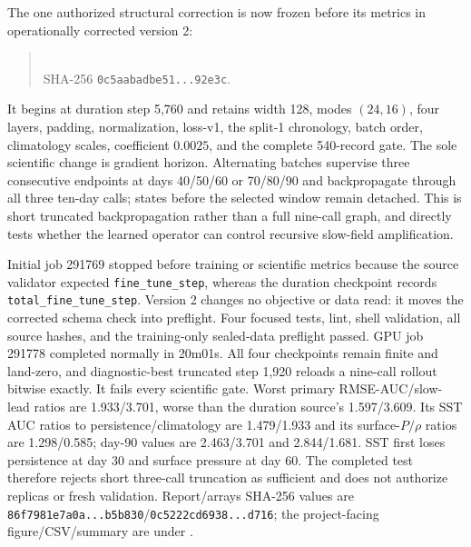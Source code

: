 \documentclass[11pt]{article}
\begin{document}
The one authorized structural correction is now frozen before its metrics in
operationally corrected version 2:
\begin{quote}
\\
SHA-256 \texttt{0c5aabadbe51...92e3c}.
\end{quote}
It begins at duration step 5,760 and retains width 128, modes \((24,16)\), four
layers, padding, normalization, loss-v1, the split-1 chronology, batch order,
climatology scales, coefficient \(0.0025\), and the complete 540-record gate.
The sole scientific change is gradient horizon.  Alternating batches supervise
three consecutive endpoints at days 40/50/60 or 70/80/90 and backpropagate through
all three ten-day calls; states before the selected window remain detached.  This is
short truncated backpropagation rather than a full nine-call graph, and directly
tests whether the learned operator can control recursive slow-field amplification.

Initial job 291769 stopped before training or scientific metrics because the source
validator expected \texttt{fine\_tune\_step}, whereas the duration checkpoint records
\texttt{total\_fine\_tune\_step}.  Version 2 changes no objective or data read: it
moves the corrected schema check into preflight.  Four focused tests, lint, shell
validation, all source hashes, and the training-only sealed-data preflight passed.
GPU job 291778 completed normally in 20m01s.  All four checkpoints remain finite and
land-zero, and diagnostic-best truncated step 1,920 reloads a nine-call rollout
bitwise exactly.  It fails every scientific gate.  Worst primary RMSE-AUC/slow-lead
ratios are 1.933/3.701, worse than the duration source's 1.597/3.609.  Its SST AUC
ratios to persistence/climatology are 1.479/1.933 and its surface-\(P/\rho\) ratios
are 1.298/0.585; day-90 values are 2.463/3.701 and 2.844/1.681.  SST first loses
persistence at day 30 and surface pressure at day 60.  The completed test therefore
rejects short three-call truncation as sufficient and does not authorize replicas or
fresh validation.  Report/arrays SHA-256 values are
\texttt{86f7981e7a0a...b5b830}/\texttt{0c5222cd6938...d716}; the project-facing
figure/CSV/summary are under
.
\end{document}
